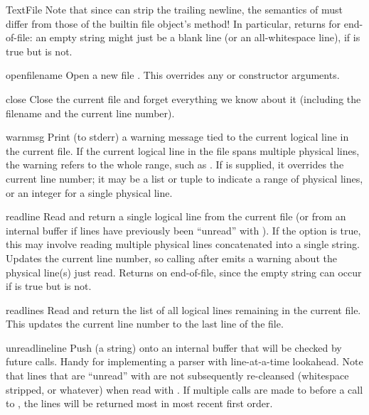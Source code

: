 \documentclass{manual}
\begin{document}
\begin{classdesc}{TextFile}{}
Note that since  can strip the trailing newline, the
semantics of  must differ from those of the builtin file
object's  method!  In particular,  
returns  for end-of-file: an empty string might just be a 
blank line (or an all-whitespace line), if  is true 
but  is not.

\begin{methoddesc}{open}{filename}
Open a new file . This overrides any  or 
 constructor arguments.
\end{methoddesc}

\begin{methoddesc}{close}{}
Close the current file and forget everything we know about it (including
the filename and the current line number).
\end{methoddesc}

\begin{methoddesc}{warn}{msg}
Print (to stderr) a warning message tied to the current logical
line in the current file.  If the current logical line in the
file spans multiple physical lines, the warning refers to the
whole range, such as .  If  is supplied, 
it overrides the current line number; it may be a list or tuple 
to indicate a range of physical lines, or an integer for a 
single physical line.
\end{methoddesc}

\begin{methoddesc}{readline}{}
Read and return a single logical line from the current file (or
from an internal buffer if lines have previously been ``unread''
with ).  If the  option 
is true, this may involve reading multiple physical lines 
concatenated into a single string.  Updates the current line number, 
so calling  after  emits a warning 
about the physical line(s) just read.  Returns  on end-of-file, 
since the empty string can occur if  is true but 
 is not.
\end{methoddesc}
\begin{methoddesc}{readlines}{}
Read and return the list of all logical lines remaining in the current file.
This updates the current line number to the last line of the file.
\end{methoddesc}
\begin{methoddesc}{unreadline}{line}
Push  (a string) onto an internal buffer that will be
checked by future  calls.  Handy for implementing
a parser with line-at-a-time lookahead. Note that lines that are ``unread''
with  are not subsequently re-cleansed (whitespace 
stripped, or whatever) when read with . If multiple
calls are made to  before a call to ,
the lines will be returned most in most recent first order.
\end{methoddesc}

\end{classdesc}
\end{document}

